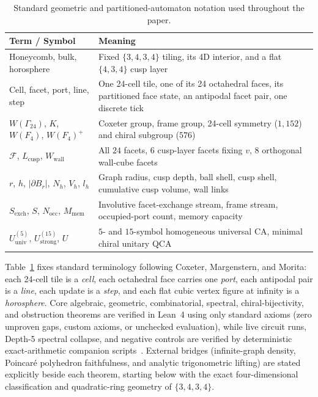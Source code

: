 \begin{table}[tb]
\centering
\caption{Standard geometric and partitioned-automaton notation used throughout the paper.}
\label{tab:notation}
\small
\begin{tabularx}{\textwidth}{@{}lX@{}}
\toprule
Term / Symbol & Meaning \\
\midrule
Honeycomb, bulk, horosphere & Fixed $\{3,4,3,4\}$ tiling, its 4D interior, and a flat $\{4,3,4\}$ cusp layer \\
Cell, facet, port, line, step & One 24-cell tile, one of its 24 octahedral faces, its partitioned face state, an antipodal facet pair, one discrete tick \\
$W(\Gamma_{24})$, $K$, $W(F_4)$, $W(F_4)^+$ & Coxeter group, frame group, 24-cell symmetry ($1{,}152$) and chiral subgroup ($576$) \\
$\mathcal{F}$, $L_{\mathrm{cusp}}$, $W_{\mathrm{wall}}$ & All $24$ facets, $6$ cusp-layer facets fixing $v$, $8$ orthogonal wall-cube facets \\
$r$, $h$, $|\partial B_r|$, $N_h$, $V_h$, $l_h$ & Graph radius, cusp depth, ball shell, cusp shell, cumulative cusp volume, wall links \\
$S_{\mathrm{exch}}$, $S$, $N_{\mathrm{occ}}$, $M_{\mathrm{mem}}$ & Involutive facet-exchange stream, frame stream, occupied-port count, memory capacity \\
$U_{\mathrm{univ}}^{(5)}$, $U_{\mathrm{strong}}^{(15)}$, $U$ & $5$- and $15$-symbol homogeneous universal CA, minimal chiral unitary QCA \\
\bottomrule
\end{tabularx}
\end{table}

Table~\ref{tab:notation} fixes standard terminology following Coxeter, Margenstern, and Morita: each 24-cell tile is a \emph{cell}, each octahedral face carries one \emph{port}, each antipodal pair is a \emph{line}, each update is a \emph{step}, and each flat cubic vertex figure at infinity is a \emph{horosphere}. Core algebraic, geometric, combinatorial, spectral, chiral-bijectivity, and obstruction theorems are verified in Lean~4 using only standard axioms (zero unproven gaps, custom axioms, or unchecked evaluation), while live circuit runs, Depth-5 spectral collapse, and negative controls are verified by deterministic exact-arithmetic companion scripts~\cite{pollard2026repo}. External bridges (infinite-graph density, Poincar\'e polyhedron faithfulness, and analytic trigonometric lifting) are stated explicitly beside each theorem, starting below with the exact four-dimensional classification and quadratic-ring geometry of $\{3,4,3,4\}$.

